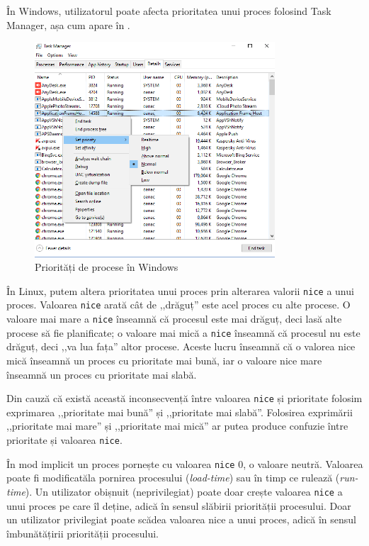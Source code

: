 În Windows, utilizatorul poate afecta prioritatea unui proces folosind Task Manager, așa cum apare în .

\begin{figure}[!htbp]
	\centering
        \includegraphics[width=0.8\textwidth]{chapters/04-process/img/task-manager-priority.png}
        \caption{Priorități de procese în Windows}
        \label{fig:process-priority-task-manager}
\end{figure}

În Linux, putem altera prioritatea unui proces prin alterarea valorii \texttt{nice} a
unui proces. Valoarea \texttt{nice} arată cât de ,,drăguț'' este acel proces cu alte
procese. O valoare mai mare a \texttt{nice} înseamnă că procesul este mai drăguț, deci
lasă alte procese să fie planificate; o valoare mai mică a \texttt{nice} înseamnă că
procesul nu este drăguț, deci ,,va lua fața'' altor procese. Aceste lucru înseamnă
că o valorea nice mică înseamnă un proces cu prioritate mai bună, iar o valoare
nice mare înseamnă un proces cu prioritate mai slabă.

\begin{note}
Din cauză că există această inconsecvență între valoarea \texttt{nice} și prioritate
folosim exprimarea ,,prioritate mai bună'' și ,,prioritate mai slabă''.
Folosirea exprimării ,,prioritate mai mare'' și ,,prioritate mai mică'' ar
putea produce confuzie între prioritate și valoarea \texttt{nice}.
\end{note}

În mod implicit un proces pornește cu valoarea \texttt{nice} 0, o valoare neutră.
Valoarea poate fi modificatăla pornirea procesului (\textit{load-time}) sau în timp ce
rulează (\textit{run-time}). Un utilizator obișnuit (neprivilegiat) poate doar crește
valoarea \texttt{nice} a unui proces pe care îl deține, adică în sensul slăbirii
priorității procesului. Doar un utilizator privilegiat poate scădea valoarea
nice a unui proces, adică în sensul îmbunătățirii priorității procesului.

